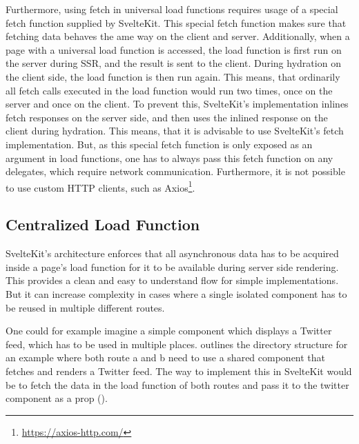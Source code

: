 
Furthermore, using fetch in universal load functions requires usage of a special fetch function supplied by SvelteKit. This special fetch function makes sure that fetching data behaves the ame way on the client and server. Additionally, when a page with a universal load function is accessed, the load function is first run on the server during SSR, and the result is sent to the client. During hydration on the client side, the load function is then run again. This means, that ordinarily all fetch calls executed in the load function would run two times, once on the server and once on the client. To prevent this, SvelteKit's implementation inlines fetch responses on the server side, and then uses the inlined response on the client during hydration. This means, that it is advisable to use SvelteKit's fetch implementation. But, as this special fetch function is only exposed as an argument in load functions, one has to always pass this fetch function on any delegates, which require network communication. Furthermore, it is not possible to use custom HTTP clients, such as Axios\footnote{\url{https://axios-http.com/}}.




\subsection{Centralized Load Function}
SvelteKit's architecture enforces that all asynchronous data has to be acquired inside a page's load function for it to be available during server side rendering. This provides a clean and easy to understand flow for simple implementations. But it can increase complexity in cases where a single isolated component has to be reused in multiple different routes.

One could for example imagine a simple component which displays a Twitter feed, which has to be used in multiple places.  outlines the directory structure for an example where both route a and b need to use a shared component that fetches and renders a Twitter feed. The way to implement this in SvelteKit would be to fetch the data in the load function of both routes and pass it to the twitter component as a prop ().

